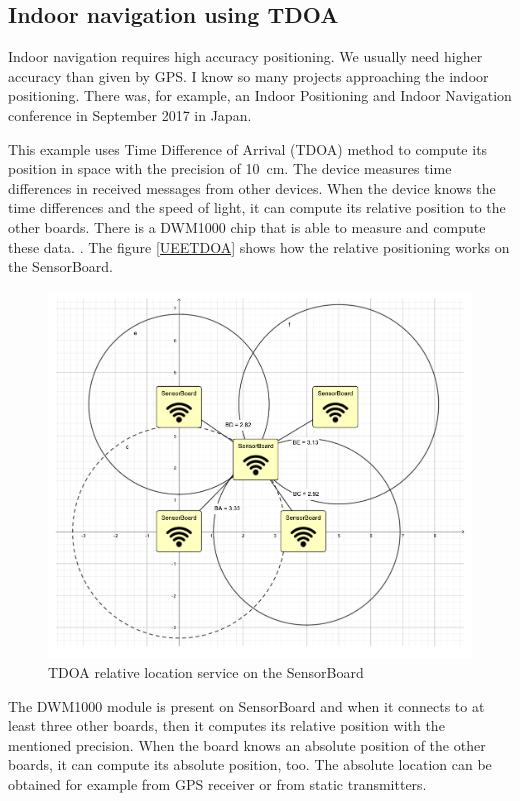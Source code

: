 \subsection{Indoor navigation using \ac{TDOA}}
Indoor navigation requires high accuracy positioning. We usually need higher accuracy than given by GPS. I know so many projects approaching the indoor positioning. There was, for example, an Indoor Positioning and Indoor Navigation conference in September 2017 in Japan.

This example uses Time Difference of Arrival (\ac{TDOA}) method to compute its position in space with the precision of \SI{10}{cm}. The device measures time differences in received messages from other devices. When the device knows the time differences and the speed of light, it can compute its relative position to the other boards. There is a DWM1000 chip that is able to measure and compute these data. \cite{decawave:DWM1000}. The figure \ref{UEETDOA} shows how the relative positioning works on the SensorBoard.

\begin{figure}
	\centering
	\label{UETDOA}
	\caption{\ac{TDOA} relative location service on the SensorBoard}
	\includegraphics[trim=5cm 6cm 5cm 5cm, clip, width=15cm]{img/UsageExamplesTDOA.pdf}
\end{figure}

The DWM1000 \cite{decawave:DWM1000} module is present on SensorBoard and when it connects to at least three other boards, then it computes its relative position with the mentioned precision. When the board knows an absolute position of the other boards, it can compute its absolute position, too. The absolute location can be obtained for example from GPS receiver or from static transmitters.

